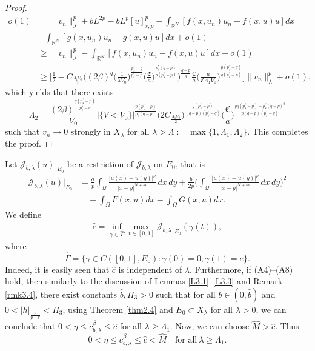 \documentclass[10pt,a4paper]{amsart}
\numberwithin{equation}{section}
\begin{document}
\begin{proof}
\begin{align*}
o(1)&= \|v_n\|_\lambda^p+bL^{2p}-bL^p[u]^p_{s,p}
-\int_{\mathbb{R}^N}[f(x,u_n)u_n-f(x,u)u]dx  \\
&-\int_{\mathbb{R}^N}[g(x,u_n)u_n-g(x,u)u]dx +o(1)    \\
&\geq  \|v_n\|_\lambda^p-\int_{\mathbb{R}^N}[f(x,u_n)u_n-f(x,u)u]dx+o(1)  \\
&\geq  \Big[\frac{1}{2}-C_{\frac{\Lambda_1 V_0}{2}}\Big((2\beta)^q
 \Big(\frac{1}{\lambda V_0}\Big)^{\frac{p_s^*-q}{p_s^*-p}}
 \Big(\frac{\mathfrak{C}}{a}\Big)^{\frac{p_s^*(q-p)}{p(p_s^*-p)}}\Big)^{\frac{q-p}{q}}
 \frac{\mathfrak{C}}{a} \Big(\frac{a}{\mathfrak{C}\Lambda_1V_0}
 \Big)^{\frac{p(p^*_s-q)}{q(p^*_s-p)}}\Big]\|v_n\|_\lambda^p+o(1),
\end{align*}
which yields that there exists
$$
\Lambda_2=\frac{(2\beta)^{\frac{q(p^*_s-p)}{p^*_s-q}}}{V_0}
 |\{V<V_0\}|^{\frac{p(p^*_s-p)}{p^*_s(q-p)}}
\Big(2C_{\frac{\Lambda_1 V_0}{2}}\Big)^{\frac{q(p^*_s-p)}{(q-p)(p^*_s-q)}}
\Big(\frac{\mathfrak{C}}{a}\Big)^{\frac{pq(p_s^*-p)+p_s^*(q-p)^2}{p(q-p)(p_s^*-q)}}
$$
such that $v_n\to 0$ strongly in $X_\lambda$ for all 
$\lambda>\Lambda:=\max\{1, \Lambda_1, \Lambda_2\}$. This completes the proof.
\end{proof}

Let $\mathcal{J}_{b,\lambda}(u)|_{E_0}$ be a restriction of $\mathcal{J}_{b,\lambda}$ 
on $E_0$, that is
\begin{equation}\label{lab3.23}
\begin{split}
\mathcal{J}_{b,\lambda}(u)|_{E_0}
&=\frac{a}{p}\int_\mathcal{Q}
 \frac{|u(x)-u(y)|^p}{|x-y|^{N+sp}}\,dx\,dy
 +\frac{b}{2p}\Big(\int_\mathcal{Q}\frac{|u(x)-u(y)|^p}{|x-y|^{N+sp}}\,dx\,dy\Big)^2 \\
&\quad -\int_\Omega F(x, u)dx-\int_\Omega G(x, u)dx.
\end{split}
\end{equation}
We define
\begin{align*}
 \widehat{c}=\inf_{\gamma\in\widehat{\Gamma}}
 \max_{t\in[0,1]}  \mathcal{J}_{b,\lambda}|_{E_0} (\gamma(t)),
\end{align*}
where
\[
\widehat{\Gamma}=\{\gamma\in C([0,1],E_0):\gamma(0)=0, \gamma(1)=e\}.
\]
Indeed, it is easily seen that $\widehat{c}$ is independent of $\lambda$. 
Furthermore, if (A4)--(A8) hold, then similarly to the discussion of
 Lemmas \ref{L3.1}--\ref{L3.3} and Remark \ref{rmk3.4}, there exist constants 
$\widehat{b}, \Pi_3>0$ such that for all $b\in(0, \widehat{b})$ and 
$0<|h|_{\frac{p}{p-r}}<\Pi_3$, using Theorem \ref{thm2.4} and 
$E_0\subset X_\lambda$ for all $\lambda>0$, we can conclude that 
$0<\eta\leq c_{b,\lambda}^\beta\leq \widehat{c}$ for all $\lambda\geq\Lambda_1$. 
Now, we can choose $\widehat{M}>\widehat{c}$. Thus
\begin{equation}\label{lab3.24}
0<\eta\leq c_{b,\lambda}^\beta\leq \widehat{c}<\widehat{M}\quad
 \text{for all}\ \lambda\geq\Lambda_1.
\end{equation}
\end{document}
